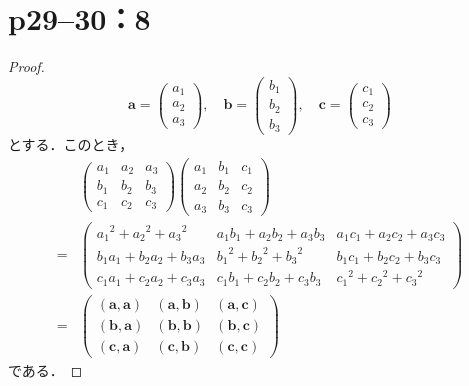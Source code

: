 \documentclass[a4paper,10pt,fleqn]{ltjsarticle}
\begin{document}
\section*{p29--30：8}
\begin{tleftbar}
    \begin{proof}
        \[
            \bm{a}=\begin{pmatrix} a_1 \\ a_2 \\ a_3 \end{pmatrix},\quad \bm{b}=\begin{pmatrix} b_1 \\ b_2 \\ b_3 \end{pmatrix},\quad \bm{c}=\begin{pmatrix} c_1 \\ c_2 \\ c_3 \end{pmatrix}
        \]
        とする．このとき，
        \begin{align*}
              &
            \begin{pmatrix}
                a_1 & a_2 & a_3 \\
                b_1 & b_2 & b_3 \\
                c_1 & c_2 & c_3
            \end{pmatrix}
            \begin{pmatrix}
                a_1 & b_1 & c_1 \\
                a_2 & b_2 & c_2 \\
                a_3 & b_3 & c_3
            \end{pmatrix}
            \\
            = & \begin{pmatrix}
                    {a_1}^2 +{a_2}^2 +{a_3}^2   & a_1 b_1 + a_2 b_2 + a_3 b_3 & a_1 c_1 + a_2 c_2 + a_3 c_3 \\
                    b_1 a_1 + b_2 a_2 + b_3 a_3 & {b_1}^2 +{b_2}^2 + {b_3}^2  & b_1 c_1 + b_2 c_2 + b_3 c_3 \\
                    c_1 a_1 + c_2 a_2 + c_3 a_3 & c_1 b_1 + c_2 b_2 + c_3 b_3 & {c_1}^2 +{c_2}^2 +{c_3}^2
                \end{pmatrix}
            \\
            = & \begin{pmatrix}
                    (\bm{a},\bm{a}) & (\bm{a},\bm{b}) & (\bm{a},\bm{c}) \\
                    (\bm{b},\bm{a}) & (\bm{b},\bm{b}) & (\bm{b},\bm{c}) \\
                    (\bm{c},\bm{a}) & (\bm{c},\bm{b}) & (\bm{c},\bm{c})
                \end{pmatrix}
        \end{align*}
        である．


\end{proof}
\end{tleftbar}
\end{document}
